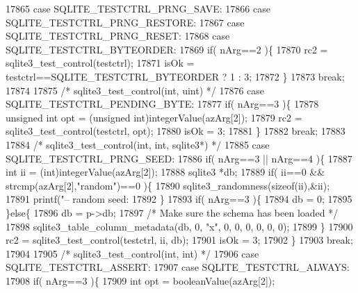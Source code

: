 \begin{DoxyCode}
{{{{{{{{{{{{{{{{{{{{{{{{{{{{{{{{{{{{{{{{{{{{{{{{{{{{{{{{{{{{{{{{{{{{{{{{{{{{{{{{{{{{{{{{{{{{{{{{{{{{{{{{{{{{{{{{{{{{{{{{{{{{{{{{{{{{{{{{{{{{{{{{17865         \textcolor{keywordflow}{case} SQLITE_TESTCTRL_PRNG_SAVE:
17866         \textcolor{keywordflow}{case} SQLITE_TESTCTRL_PRNG_RESTORE:
17867         \textcolor{keywordflow}{case} SQLITE_TESTCTRL_PRNG_RESET:
17868         \textcolor{keywordflow}{case} SQLITE_TESTCTRL_BYTEORDER:
17869           \textcolor{keywordflow}{if}( nArg==2 )\{
17870             rc2 = sqlite3_test_control(testctrl);
17871             isOk = testctrl==SQLITE_TESTCTRL_BYTEORDER ? 1 : 3;
17872           \}
17873           \textcolor{keywordflow}{break};
17874 
17875         \textcolor{comment}{/* sqlite3\_test\_control(int, uint) */}
17876         \textcolor{keywordflow}{case} SQLITE_TESTCTRL_PENDING_BYTE:
17877           \textcolor{keywordflow}{if}( nArg==3 )\{
17878             \textcolor{keywordtype}{unsigned} \textcolor{keywordtype}{int} opt = (\textcolor{keywordtype}{unsigned} int)integerValue(azArg[2]);
17879             rc2 = sqlite3_test_control(testctrl, opt);
17880             isOk = 3;
17881           \}
17882           \textcolor{keywordflow}{break};
17883 
17884         \textcolor{comment}{/* sqlite3\_test\_control(int, int, sqlite3*) */}
17885         \textcolor{keywordflow}{case} SQLITE_TESTCTRL_PRNG_SEED:
17886           \textcolor{keywordflow}{if}( nArg==3 || nArg==4 )\{
17887             \textcolor{keywordtype}{int} ii = (int)integerValue(azArg[2]);
17888             sqlite3 *db;
17889             \textcolor{keywordflow}{if}( ii==0 && strcmp(azArg[2],\textcolor{stringliteral}{"random"})==0 )\{
17890               sqlite3_randomness(\textcolor{keyword}{sizeof}(ii),&ii);
17891               printf(\textcolor{stringliteral}{"-- random seed: %
17892             \}
17893             \textcolor{keywordflow}{if}( nArg==3 )\{
17894               db = 0;
17895             \}\textcolor{keywordflow}{else}\{
17896               db = p->db;
17897               \textcolor{comment}{/* Make sure the schema has been loaded */}
17898               sqlite3_table_column_metadata(db, 0, \textcolor{stringliteral}{"x"}, 0, 0, 0, 0, 0, 0);
17899             \}
17900             rc2 = sqlite3_test_control(testctrl, ii, db);
17901             isOk = 3;
17902           \}
17903           \textcolor{keywordflow}{break};
17904 
17905         \textcolor{comment}{/* sqlite3\_test\_control(int, int) */}
17906         \textcolor{keywordflow}{case} SQLITE_TESTCTRL_ASSERT:
17907         \textcolor{keywordflow}{case} SQLITE_TESTCTRL_ALWAYS:
17908           \textcolor{keywordflow}{if}( nArg==3 )\{
17909             \textcolor{keywordtype}{int} opt = booleanValue(azArg[2]);
}}}}}}}}}}}}}}}}}}}}}}}}}}}}}}}}}}}}}}}}}}}}}}}}}}}}}}}}}}}}}}}}}}}}}}}}}}}}}}}}}}}}}}}}}}}}}}}}}}}}}}}}}}}}}}}}}}}}}}}}}}}}}}}}}}}}}}}}}}}}}}}}}
\end{DoxyCode}
